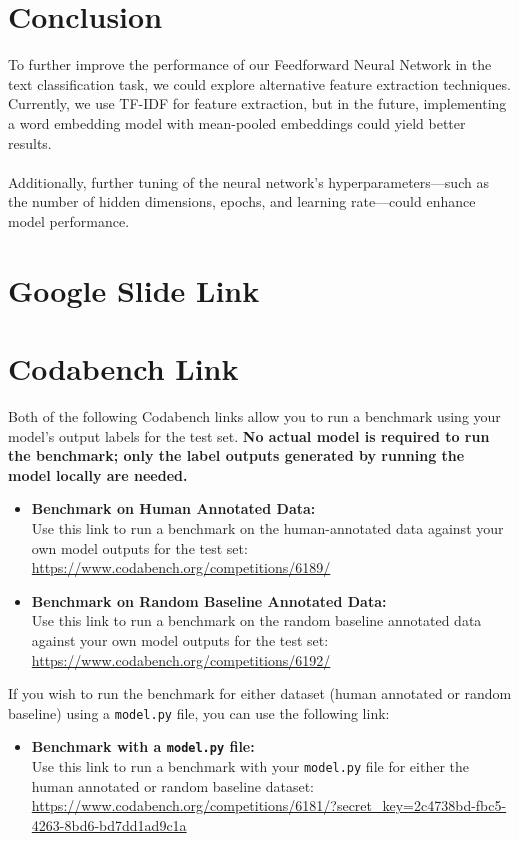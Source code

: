 \documentclass{article}
\begin{document}
\section*{Conclusion}
 
To further improve the performance of our Feedforward Neural Network in the text classification task, we could explore alternative feature extraction techniques. Currently, we use TF-IDF for feature extraction, but in the future, implementing a word embedding model with mean-pooled embeddings could yield better results. \\ \\
\noindent
Additionally, further tuning of the neural network's hyperparameters—such as the number of hidden dimensions, epochs, and learning rate—could enhance model performance.

\section*{Google Slide Link}

\section*{Codabench Link}
Both of the following Codabench links allow you to run a benchmark using your model's output labels for the test set. \textbf{No actual model is required to run the benchmark; only the label outputs generated by running the model locally are needed.}

\begin{itemize}
    \item \textbf{Benchmark on Human Annotated Data:} \\
    Use this link to run a benchmark on the human-annotated data against your own model outputs for the test set: 
    \url{https://www.codabench.org/competitions/6189/}
    
    \item \textbf{Benchmark on Random Baseline Annotated Data:} \\
    Use this link to run a benchmark on the random baseline annotated data against your own model outputs for the test set: 
    \url{https://www.codabench.org/competitions/6192/}
\end{itemize}
\noindent
If you wish to run the benchmark for either dataset (human annotated or random baseline) using a \texttt{model.py} file, you can use the following link:

\begin{itemize}
    \item \textbf{Benchmark with a \texttt{model.py} file:} \\
    Use this link to run a benchmark with your \texttt{model.py} file for either the human annotated or random baseline dataset: 
    \url{https://www.codabench.org/competitions/6181/?secret_key=2c4738bd-fbc5-4263-8bd6-bd7dd1ad9c1a}
\end{itemize}
\end{document}
